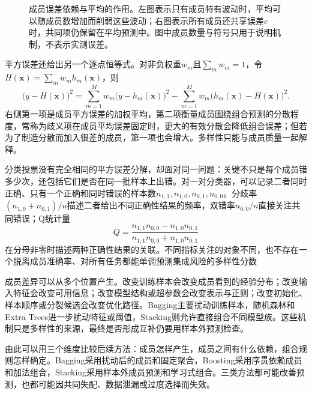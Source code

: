 \begin{figure}[htbp]
  \centering
  
  \caption{成员误差依赖与平均的作用。左图表示只有成员特有波动时，平均可以随成员数增加而削弱这些波动；右图表示所有成员还共享误差$c$时，共同项仍保留在平均预测中。图中成员数量与符号只用于说明机制，不表示实测误差。}
  \label{fig:ensemble-error-dependence}
\end{figure}

平方误差还给出另一个逐点恒等式。对非负权重$w_m$且$\sum_mw_m=1$，令$H(\bm{x})=\sum_mw_mh_m(\bm{x})$，则
\begin{equation}
  \bigl(y-H(\bm{x})\bigr)^2
  =
  \sum_{m=1}^{M}w_m\bigl(y-h_m(\bm{x})\bigr)^2
  -
  \sum_{m=1}^{M}w_m\bigl(h_m(\bm{x})-H(\bm{x})\bigr)^2.
  \label{eq:ensemble-ambiguity-decomposition}
\end{equation}
右侧第一项是成员平方误差的加权平均，第二项衡量成员围绕组合预测的分散程度，常称为歧义项在成员平均误差固定时，更大的有效分散会降低组合误差；但若为了制造分散而加入很差的成员，第一项也会增大。多样性只能与成员质量一起解释。

分类投票没有完全相同的平方误差分解，却面对同一问题：关键不只是每个成员错多少次，还包括它们是否在同一批样本上出错。对一对分类器，可以记录二者同时正确、只有一个正确和同时错误的样本数$n_{1,1},n_{1,0},n_{0,1},n_{0,0}$。分歧率$(n_{1,0}+n_{0,1})/n$描述二者给出不同正确性结果的频率，双错率$n_{0,0}/n$直接关注共同错误；Q统计量
\[
  Q=
  \frac{n_{1,1}n_{0,0}-n_{1,0}n_{0,1}}
       {n_{1,1}n_{0,0}+n_{1,0}n_{0,1}}
\]
在分母非零时描述两种正确性结果的关联。不同指标关注的对象不同，也不存在一个脱离成员准确率、对所有任务都能单调预测集成风险的多样性分数

成员差异可以从多个位置产生。改变训练样本会改变成员看到的经验分布；改变输入特征会改变可用信息；改变模型结构或超参数会改变表示与正则；改变初始化、样本顺序或分裂候选会改变优化路径。Bagging主要扰动训练样本，随机森林和Extra Trees进一步扰动特征或阈值，Stacking则允许直接组合不同模型族。这些机制只是多样性的来源，最终是否形成互补仍要用样本外预测检查。

由此可以用三个维度比较后续方法：成员怎样产生，成员之间有什么依赖，组合规则怎样确定。Bagging采用扰动后的成员和固定聚合，Boosting采用序贯依赖成员和加法组合，Stacking采用样本外成员预测和学习式组合。三类方法都可能改善预测，也都可能因共同失配、数据泄漏或过度选择而失效。
